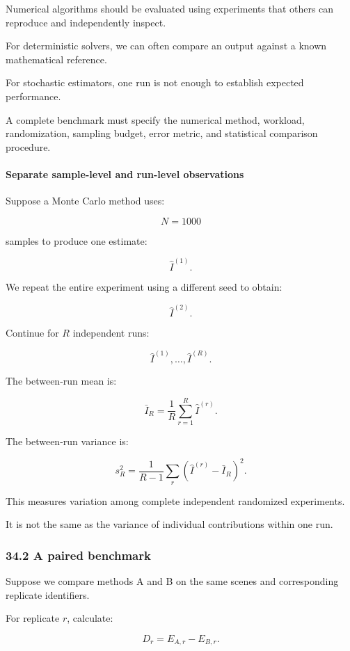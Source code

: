 Numerical algorithms should be evaluated using experiments that others can reproduce and independently inspect.

For deterministic solvers, we can often compare an output against a known mathematical reference.

For stochastic estimators, one run is not enough to establish expected performance.

A complete benchmark must specify the numerical method, workload, randomization, sampling budget, error metric, and statistical comparison procedure.

\paragraph{Separate sample-level and run-level observations}\label{separate-sample-level-and-run-level-observations}

Suppose a Monte Carlo method uses:

\[ N=1000 \]

samples to produce one estimate:

\[ \widehat I^{(1)}. \]

We repeat the entire experiment using a different seed to obtain:

\[ \widehat I^{(2)}. \]

Continue for \(R\) independent runs:

\[ \widehat I^{(1)},\ldots,\widehat I^{(R)}. \]

The between-run mean is:

\[ \bar I_R= \frac1R\sum_{r=1}^{R}\widehat I^{(r)}. \]

The between-run variance is:

\[ s_R^2= \frac1{R-1} \sum_r(\widehat I^{(r)}-\bar I_R)^2. \]

This measures variation among complete independent randomized experiments.

It is not the same as the variance of individual contributions within one run.

\subsubsection{34.2 A paired benchmark}\label{a-paired-benchmark}

Suppose we compare methods A and B on the same scenes and corresponding replicate identifiers.

For replicate \(r\), calculate:

\[ D_r=E_{A,r}-E_{B,r}. \]

